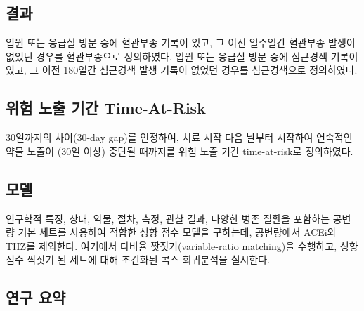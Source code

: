 \documentclass[11pt]{book}
\theoremstyle{definition}
\theoremstyle{definition}
\theoremstyle{definition}
\theoremstyle{remark}
\begin{document}
\subsection{결과}\label{-2}

입원 또는 응급실 방문 중에 혈관부종 기록이 있고, 그 이전 일주일간
혈관부종 발생이 없었던 경우를 혈관부종으로 정의하였다. 입원 또는 응급실
방문 중에 심근경색 기록이 있고, 그 이전 180일간 심근경색 발생 기록이
없었던 경우를 심근경색으로 정의하였다.

\subsection{위험 노출 기간 Time-At-Risk}\label{---time-at-risk-1}

30일까지의 차이(30-day gap)를 인정하여, 치료 시작 다음 날부터 시작하여
연속적인 약물 노출이 (30일 이상) 중단될 때까지를 위험 노출 기간
time-at-risk로 정의하였다.

\subsection{모델}

인구학적 특징, 상태, 약물, 절차, 측정, 관찰 결과, 다양한 병존 질환을
포함하는 공변량 기본 세트를 사용하여 적합한 성향 점수 모델을 구하는데,
공변량에서 ACEi와 THZ를 제외한다. 여기에서 다비율 짯짓기(variable-ratio
matching)을 수행하고, 성향 점수 짝짓기 된 세트에 대해 조건화된 콕스
회귀분석을 실시한다.

\subsection{연구 요약}\label{-}
\end{document}
